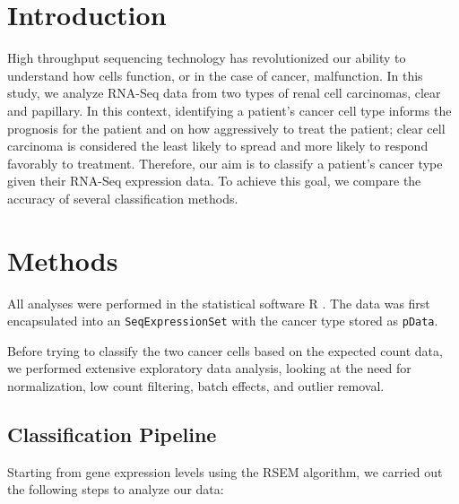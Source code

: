 \section{Introduction}

High throughput sequencing technology has revolutionized our ability to
understand how cells function, or in the case of cancer, malfunction. In this
study, we analyze RNA-Seq data from two types of renal cell carcinomas, clear
and papillary.  In this context, identifying a patient's cancer cell type
informs the prognosis for the patient and on how aggressively to treat the
patient; clear cell carcinoma is considered the least likely to spread and more
likely to respond favorably to treatment. Therefore, our aim is to classify a
patient's cancer type given their RNA-Seq expression data. To achieve this
goal, we compare the accuracy of several classification methods.


\section{Methods}

All analyses were performed in the statistical software R \cite{rmanual}. The
data was first encapsulated into an \texttt{SeqExpressionSet} \cite{biobase}
with the cancer type stored as \texttt{pData}.

Before trying to classify the two cancer cells based on
the expected count data, we performed extensive exploratory data analysis,
looking at the need for normalization, low count filtering, batch effects, and
outlier removal.

\subsection{Classification Pipeline}

Starting from gene expression levels using the RSEM algorithm, we carried out
the following steps to analyze our data:

